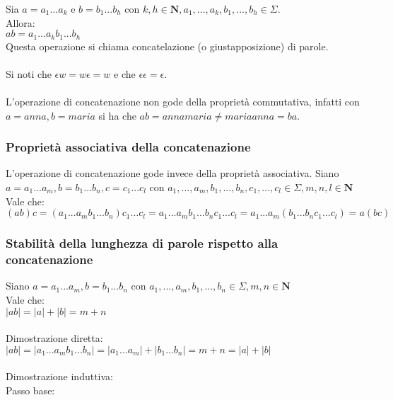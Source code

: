 \documentclass[]{article}
\begin{document}
Sia
\begin{math}
a = a_1...a_k
\end{math}
e
\begin{math}
b = b_1...b_h
\end{math}
con
\begin{math}
k, h \in \mathbf{N},
a_1, ..., a_k, b_1, ..., b_h \in \Sigma
\end{math}.
\\
Allora:
\\
\begin{math}
ab = a_1...a_kb_1...b_h
\end{math}
\\
Questa operazione si chiama concatelazione (o giustapposizione) di parole.
\\
\\
Si noti che \mbox{$\epsilon w = w \epsilon = w$} e che \mbox{$\epsilon \epsilon = \epsilon$}.
\\
\\
L'operazione di concatenazione non gode della proprietà commutativa, infatti con \mbox{$a=anna, b=maria$} si ha
che \mbox{$ab = annamaria \neq mariaanna = ba$}.


\subsubsection{Proprietà associativa della concatenazione}

L'operazione di concatenazione gode invece della proprietà associativa.
Siano \mbox{$a=a_1...a_m, b=b_1...b_n, c=c_1...c_l$} con
\mbox{$a_1, ..., a_m, b_1, ..., b_n, c_1, ..., c_l \in \Sigma, m, n, l \in \mathbf{N}$}
\\
Vale che:
\\
\mbox{$(ab)c = (a_1...a_mb_1...b_n)c_1...c_l = a_1...a_mb_1...b_nc_1...c_l = a_1...a_m(b_1...b_nc_1...c_l) = a(bc)$}


\subsubsection{Stabilità della lunghezza di parole rispetto alla concatenazione}

Siano \mbox{$a=a_1...a_m, b=b_1...b_n$} con
\mbox{$a_1, ..., a_m, b_1, ..., b_n \in \Sigma, m, n \in \mathbf{N}$}
\\
Vale che:
\\
\mbox{$|ab| = |a| + |b| = m + n$}
\\
\\
Dimostrazione diretta:
\\
\mbox{$|ab| = |a_1...a_mb_1...b_n| = |a_1...a_m| + |b_1...b_n| = m + n = |a| + |b|$}
\\
\\
Dimostrazione induttiva:
\\
Passo base:
\end{document}
